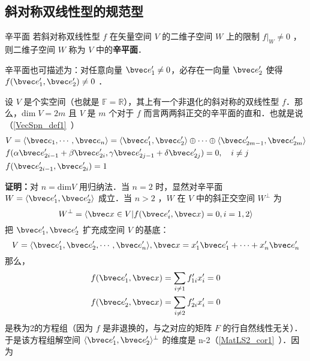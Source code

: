  \subsection{斜对称双线性型的规范型}
 \begin{definition}{辛平面}
 若斜对称双线性型 $f$ 在矢量空间 $V$ 的二维子空间 $W$ 上的限制 $f|_W\neq0$ ，则二维子空间 $W$ 称为 $V$ 中的\textbf{辛平面}．
 \end{definition}
 辛平面也可描述为：对任意向量 $\bvec e'_1\neq0$，必存在一向量 $\bvec e'_2$ 使得 $f(\bvec e'_1,\bvec e'_2)\neq0$ ．
 \begin{theorem}{}
 设 $V$ 是个实空间（也就是 $\mathbb{F}=\mathbb{R}$），其上有一个非退化的斜对称的双线性型 $f$．那么，$\mathrm{dim}\;V=2m$ 且 $V$ 是 $m$ 个对于 $f$ 而言两两斜正交的辛平面的直和．也就是说（\autoref{VecSpn_def1}~）
 \begin{equation}
 \begin{aligned}
 &V=\langle\bvec e_1,\cdots,\bvec e_n\rangle=\langle\bvec e'_1,\bvec e'_2\rangle\oplus\cdots\oplus\langle\bvec e'_{2m-1},\bvec e'_{2m}\rangle\\
&f(\alpha\bvec e'_{2i-1}+\beta\bvec e'_{2i},\gamma\bvec e'_{2j-1}+\delta\bvec e'_{2j})=0,\quad i\neq j\\
 &f(\bvec e'_{2i-1},\bvec e'_{2i})=1
 \end{aligned}
 \end{equation}

 \end{theorem}
\textbf{证明：}对 $n=\mathrm{dim} V$ 用归纳法．当 $n=2$ 时，显然对辛平面 $W=\langle \bvec e'_1,\bvec e'_2\rangle$ 成立．当 $n>2$ ，$W$ 在 $V$ 中的斜正交空间 $W^{\perp}$ 为
\begin{equation}
W^{\perp}=\langle\bvec x\in V|f(\bvec e'_i,\bvec x)=0,i=1,2\rangle
\end{equation}
把 $\bvec e'_1,\bvec e'_2$ 扩充成空间 $V$ 的基底：
\begin{equation}
V=\langle \bvec e'_1,\bvec e'_2,\cdots,\bvec e'_n\rangle, \bvec x=x'_1\bvec e'_1+\cdots+x'_n\bvec e'_n
\end{equation}
那么，
\begin{equation}
\begin{aligned}
&f(\bvec e'_1,\bvec x)=\sum_{i\neq 1}f'_{1i}x'_i=0\\
&f(\bvec e'_2,\bvec x)=\sum_{i\neq 2}f'_{2i}x'_i=0
\end{aligned}
\end{equation}
是秩为2的方程组（因为 $f$ 是非退换的，与之对应的矩阵 $F$ 的行自然线性无关）．于是该方程组解空间 $\langle\bvec e'_1,\bvec e'_2\rangle^{\perp}$ 的维度是 n-2（\autoref{MatLS2_cor1}~）．因为

